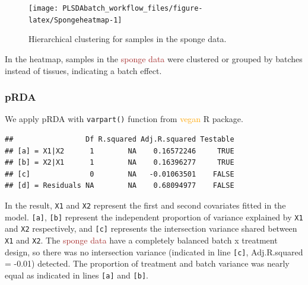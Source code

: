 \documentclass[
]{book}
\newenvironment{Shaded}{\begin{snugshade}}{\end{snugshade}}
\newcommand{\AttributeTok}[1]{\textcolor[rgb]{0.77,0.63,0.00}{#1}}
\newcommand{\FunctionTok}[1]{\textcolor[rgb]{0.00,0.00,0.00}{#1}}
\newcommand{\NormalTok}[1]{#1}
\newcommand{\OtherTok}[1]{\textcolor[rgb]{0.56,0.35,0.01}{#1}}
\newcommand{\SpecialCharTok}[1]{\textcolor[rgb]{0.00,0.00,0.00}{#1}}
\begin{document}
\begin{figure}

{\centering \texttt{[image: PLSDAbatch\_workflow\_files/figure-latex/Spongeheatmap-1]} 

}

\caption{Hierarchical clustering for samples in the sponge data.}\label{fig:Spongeheatmap}
\end{figure}

In the heatmap, samples in the \textcolor{brown}{sponge data} were clustered or grouped by batches instead of tissues, indicating a batch effect.

\hypertarget{prda-1}{%
\subsubsection{pRDA}\label{prda-1}}

We apply pRDA with \texttt{varpart()} function from \textcolor{orange}{vegan} R package.

\begin{Shaded}
\end{Shaded}

\begin{verbatim}
##                 Df R.squared Adj.R.squared Testable
## [a] = X1|X2      1        NA    0.16572246     TRUE
## [b] = X2|X1      1        NA    0.16396277     TRUE
## [c]              0        NA   -0.01063501    FALSE
## [d] = Residuals NA        NA    0.68094977    FALSE
\end{verbatim}

In the result, \texttt{X1} and \texttt{X2} represent the first and second covariates fitted in the model. \texttt{{[}a{]}}, \texttt{{[}b{]}} represent the independent proportion of variance explained by \texttt{X1} and \texttt{X2} respectively, and \texttt{{[}c{]}} represents the intersection variance shared between \texttt{X1} and \texttt{X2}. The \textcolor{brown}{sponge data} have a completely balanced batch x treatment design, so there was no intersection variance (indicated in line \texttt{{[}c{]}}, Adj.R.squared = -0.01) detected. The proportion of treatment and batch variance was nearly equal as indicated in lines \texttt{{[}a{]}} and \texttt{{[}b{]}}.
\end{document}
